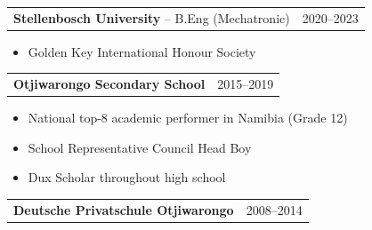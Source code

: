 \documentclass[10pt,a4paper]{article}
\begin{document}
    \noindent\begin{tabularx}{\linewidth}{>{\raggedright\arraybackslash}X r}
      \textbf{Stellenbosch University} -- B.Eng (Mechatronic) & 2020--2023 \\
    \end{tabularx}

    \vspace{-0.3em}
    \begin{itemize}[leftmargin=2.2em, itemsep=0pt, topsep=0.15em]
      \item Golden Key International Honour Society
    \end{itemize}
    \vspace{-0.2em}

    \noindent\begin{tabularx}{\linewidth}{>{\raggedright\arraybackslash}X r}
      \textbf{Otjiwarongo Secondary School} & 2015--2019 \\
    \end{tabularx}

    \vspace{-0.3em}
    \begin{itemize}[leftmargin=2.2em, itemsep=0pt, topsep=0.15em]
      \item National top-8 academic performer in Namibia (Grade 12)
      \item School Representative Council Head Boy
      \item Dux Scholar throughout high school
    \end{itemize}
    \vspace{-0.2em}
    
    \noindent\begin{tabularx}{\linewidth}{>{\raggedright\arraybackslash}X r}
      \textbf{Deutsche Privatschule Otjiwarongo} & 2008--2014 \\
    \end{tabularx}

\end{document}
